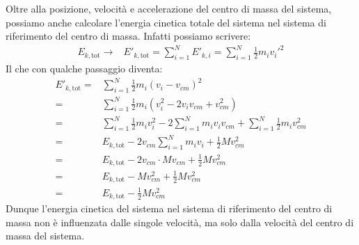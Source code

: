         Oltre alla posizione, velocità e accelerazione del centro di massa del sistema, possiamo anche calcolare l'energia cinetica totale del sistema nel sistema di riferimento del centro di massa. Infatti possiamo scrivere:
        \begin{align}
            E_{k,\text{tot}}\rightarrow & E'_{k,\text{tot}} = \sum_{i=1}^{N} E'_{k,i} = \sum_{i=1}^{N} \frac{1}{2}m_i v_i'^2
        \end{align}
        Il che con qualche passaggio diventa:
        \begin{align*}
            E'_{k,\text{tot}} = & \sum_{i=1}^{N} \frac{1}{2}m_i \left(v_i - v_{cm}\right)^2\\
            = & \sum_{i=1}^{N} \frac{1}{2}m_i \left(v_i^2 - 2v_iv_{cm} + v_{cm}^2\right)\\
            = & \sum_{i=1}^{N} \frac{1}{2}m_i v_i^2 - 2\sum_{i=1}^{N} m_i v_iv_{cm} + \sum_{i=1}^{N} \frac{1}{2}m_i v_{cm}^2\\
            = & E_{k,\text{tot}} - 2v_{cm}\sum_{i=1}^{N} m_i v_i + \frac{1}{2}M v_{cm}^2\\
            = & E_{k,\text{tot}} - 2v_{cm}\cdot Mv_{cm} + \frac{1}{2}M v_{cm}^2\\
            = & E_{k,\text{tot}} - Mv_{cm}^2 + \frac{1}{2}M v_{cm}^2\\
            = & E_{k,\text{tot}} - \frac{1}{2}M v_{cm}^2
        \end{align*}
        Dunque l'energia cinetica del sistema nel sistema di riferimento del centro di massa non è influenzata dalle singole velocità, ma solo dalla velocità del centro di massa del sistema.

